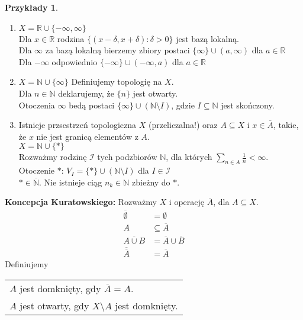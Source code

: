 \documentclass[twoside,10pt]{article}
\theoremstyle{definition}
\theoremstyle{definition}
\theoremstyle{definition}
\theoremstyle{definition}
\theoremstyle{remark}
\theoremstyle{definition}
\theoremstyle{definition}
\theoremstyle{definition}
\theoremstyle{definition}
\theoremstyle{definition}
\newtheorem*{przy}{Przykłady}
\theoremstyle{definition}
\begin{document}
\begin{przy} \hfill 
    \begin{enumerate}[(1)]
        \item $X = \mathbb R \cup \{-\infty,\infty\}$ \\ 
            Dla $x \in \mathbb R$ rodzina $\{(x-\delta,x+\delta): \delta > 0\}$ jest bazą lokalną. \\
            Dla $\infty$ za bazą lokalną bierzemy zbiory postaci $\{\infty\} \cup (a,\infty)$ dla $a \in \mathbb R$\\
            Dla $-\infty$ odpowiednio $\{-\infty\} \cup (-\infty,a)$ dla $a \in \mathbb R$
        \item $X = \mathbb N \cup \{\infty\}$ Definiujemy topologię na $X$. \\ 
            Dla $n \in \mathbb N$ deklarujemy, że $\{n\}$ jest otwarty. \\ 
            Otoczenia $\infty$ bedą postaci $\{\infty\} \cup (\mathbb N \setminus I)$, gdzie $I \subseteq \mathbb N$
            jest skończony.
        \item Istnieje przsestrzeń topologiczna $X$ (przeliczalna!) oraz $A \subseteq X$ i $x \in \overline A$, 
            takie, że $x$ nie jest granicą elementów z $A$. \\ 
            $X = \mathbb N \cup \{ \ast \}$ \\
            Rozważmy rodzinę $\mathcal I$ tych podzbiorów $\mathbb N$, dla których $\sum\limits_{n \in A} 
            \frac{1}{n} < \infty$. \\ 
            Otoczenie $\ast$: $V_I = \{\ast\} \cup (\mathbb N \setminus I)$ dla $I \in \mathcal I$ \\ 
            $\ast \in \overline{\mathbb N}$. Nie istnieje ciąg $n_k \in \mathbb N$ zbieżny do $\ast$.
    \end{enumerate} 
\end{przy}
\textbf{Koncepcja Kuratowskiego:} Rozważmy $X$ i operację $\overline A$, dla $ A \subseteq X$.
\begin{align*}
    \overline \emptyset &= \emptyset \\  
    A &\subseteq \overline A \\ 
    \overline{ A \cup B} &= \overline A \cup \overline B \\ 
    \overline{\overline A} &= \overline A    
\end{align*}
Definiujemy \begin{tabular}[t]{l} $A$ jest domknięty, gdy $\overline A = A$. \\ 
$A$ jest otwarty, gdy $X \setminus A$ jest domknięty.\end{tabular} 
\end{document}
